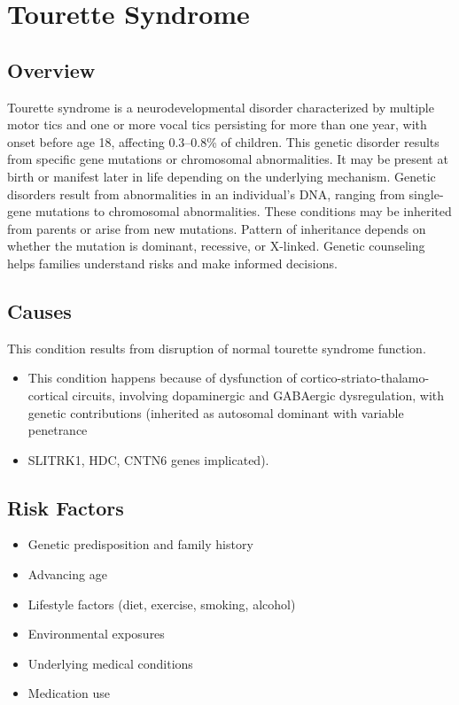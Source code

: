 \chapter{Tourette Syndrome}
\label{sec:Tourette Syndrome}

\section{Overview}
Tourette syndrome is a neurodevelopmental disorder characterized by multiple motor tics and one or more vocal tics persisting for more than one year, with onset before age 18, affecting 0.3--0.8\% of children. This genetic disorder results from specific gene mutations or chromosomal abnormalities. It may be present at birth or manifest later in life depending on the underlying mechanism. Genetic disorders result from abnormalities in an individual's DNA, ranging from single-gene mutations to chromosomal abnormalities. These conditions may be inherited from parents or arise from new mutations. Pattern of inheritance depends on whether the mutation is dominant, recessive, or X-linked. Genetic counseling helps families understand risks and make informed decisions.
\section{Causes}
This condition results from disruption of normal tourette syndrome function.

\begin{itemize}[noitemsep]
  \item This condition happens because of dysfunction of cortico-striato-thalamo-cortical circuits, involving dopaminergic and GABAergic dysregulation, with genetic contributions (inherited as autosomal dominant with variable penetrance
  \item SLITRK1, HDC, CNTN6 genes implicated).
\end{itemize}
\section{Risk Factors}


\begin{itemize}[noitemsep]
  \item Genetic predisposition and family history
  \item Advancing age
  \item Lifestyle factors (diet, exercise, smoking, alcohol)
  \item Environmental exposures
  \item Underlying medical conditions
  \item Medication use
\end{itemize}
